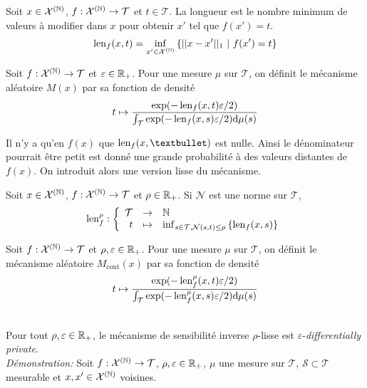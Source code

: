 
Soit \(x \in \mathcal X^{(\mathbb{N})}\), \(f : \mathcal X^{(\mathbb{N})} \to \mathcal T\) et \(t \in \mathcal T\). La longueur est le nombre minimum de valeurs à modifier dans \(x\) pour obtenir \(x'\) tel que \(f(x') = t\). 
\[
    \operatorname{len}_f(x,t) = \inf_{x' \in \mathcal X^{(\mathbb{N})}}\left\{|| x - x'||_1 \ |\ f(x') = t \right\}    
\]


Soit \(f : \mathcal X^{(\mathbb{N})} \to \mathcal T\) et \(\varepsilon \in \mathbb{R}_+\). Pour une mesure \(\mu\) sur \(\mathcal T\), on définit le mécanisme aléatoire \(M(x)\) par sa fonction de densité 
\[
    t \mapsto \dfrac{\exp(-\operatorname{len}_f(x, t)\varepsilon/2)}{\int_\mathcal T \exp(-\operatorname{len}_f(x, s)\varepsilon/2)\mathrm{d} \mu(s)}    
\] 

Il n'y a qu'en \(f(x)\) que \(\len_f(x,•)\) est nulle. Ainsi le dénominateur pourrait être petit est donné une grande probabilité à des valeurs distantes de \(f(x)\). On \cite{mcsherry2007mechanism} introduit alors une version lisse du mécanisme.\\


Soit \(x \in \mathcal X^{(\mathbb{N})}\), \(f : \mathcal X^{(\mathbb{N})} \to \mathcal T\) et \(\rho \in \mathbb{R}_+\). Si \(\mathcal N\) est une norme sur \(\mathcal T\),
\[
    \len_f^{\rho} : 
    \left\{
        \begin{array}[]{rcl}
            \mathcal T & \to & \N\\
            t & \mapsto & \inf_{s \in \mathcal T, \mathcal N(s,t) \leq \rho}\left\{\len_f(x,s) \right\}  
        \end{array}
    \right.    
\]


Soit \(f : \mathcal X^{(\mathbb{N})} \to \mathcal T\) et \(\rho, \varepsilon \in \mathbb{R}_+\). Pour une mesure \(\mu\) sur \(\mathcal T\), on définit le mécanisme aléatoire \(M_{\text{cont}}(x)\) par sa fonction de densité 
\[
    t \mapsto \dfrac{\exp(-\operatorname{len}_f^\rho(x, t)\varepsilon/2)}{\int_\mathcal T \exp(-\operatorname{len}_f^\rho(x, s)\varepsilon/2)\mathrm{d} \mu(s)}    
\] 

\theoreme{}\\
Pour tout \(\rho,\varepsilon \in \mathbb{R}_+\), le mécanisme de sensibilité inverse \(\rho\)-lisse est \(\varepsilon\)-\textit{differentially private}. \\

\textit{Démonstration: } Soit \(f : \mathcal X^{(\mathbb{N})} \to \mathcal T\), \(\rho, \varepsilon \in \mathbb{R}_+\), \(\mu\) une mesure sur \(\mathcal T\), \(\mathcal S \subset \mathcal T\) mesurable et \(x,x' \in \mathcal X^{(\mathbb{N})}\) voisines. \\

